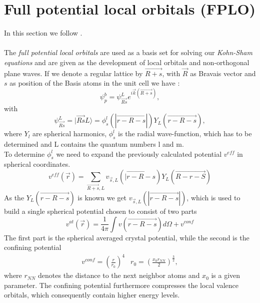 		\section{Full potential local orbitals (FPLO)}
			In this section we follow \cite{FPLO}. \\\\
			The \textit{full potential local orbitals} are used as a basis set for solving our \textit{Kohn-Sham equations} and are given as the development of local orbitals and non-orthogonal plane waves. If we denote a regular lattice by $\vec{R + s}$, with $\vec R$ as Bravais vector and $s$ as position of the Basis atoms in the unit cell we have :
			\begin{equation}
			\psi_p^b = \psi_\vec{Rs}^L e^{i\vec k (\vec{R + s})},
			\end{equation}
			with 
			\begin{equation}
				\label{eq:FPLOBasisOrbitals}
				\psi_\vec{Rs}^L = | \vec{Rs}L \rangle = \phi_s^l (|\vec{r - R - s}|) Y_L(\vec{ r - R - s}),
			\end{equation}
			where $Y_l$ are spherical harmonics, $\phi_s^l$ is the radial wave-function, which has to be determined and L contains the quantum numbers l and m. \\
			To  determine $\phi_s^l$ we need to expand the previously calculated potential $v^{eff}$ in spherical coordinates.
			\begin{equation}
				v^{eff}(\vec r) = \sum_{\vec{R+s}, L} v_{\vec s, L} (|\vec{r - R - s}) Y_L(\vec{R - r -S})
			\end{equation}
			As the $Y_L(\vec{r -R -s})$ is known we get $v_{\vec s, L} (|\vec{r - R - s}|)$, which is used to build a single spherical potential chosen to consist of two parts 
			\begin{equation}
				v^{at}(\vec r) = \frac{1}{4 \pi} \int v(\vec{r - R -s})d \Omega + v^{conf}
			\end{equation}
			The first part is the spherical averaged crystal potential, while the second is the confining potential
			\begin{equation}
				\begin{split}
					v^{conf} = \left( \frac{r}{r_0} \right)^4 & r_0 = \left( \frac{x_0 r_{NN}}{2} \right)^{\frac{3}{2}},
				\end{split}
			\end{equation}
			where $r_{NN}$ denotes the distance to the next neighbor atoms and $x_0$ is a given parameter. The confining potential furthermore compresses the local valence orbitals, which consequently contain higher energy levels. \\\\
